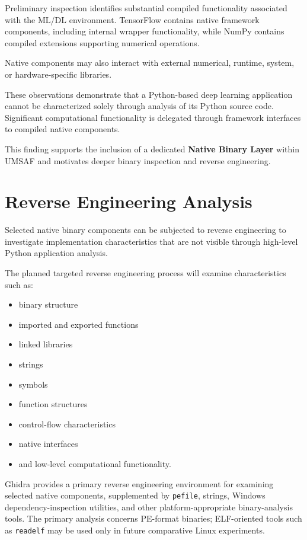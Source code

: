 \documentclass[
  12pt,
  letterpaper,
  oneside]{report}
\providecommand{\tightlist}{%
  \setlength{\itemsep}{0pt}\setlength{\parskip}{0pt}}
\begin{document}
Preliminary inspection identifies substantial compiled functionality
associated with the ML/DL environment. TensorFlow contains native
framework components, including internal wrapper functionality, while
NumPy contains compiled extensions supporting numerical operations.

Native components may also interact with external numerical, runtime,
system, or hardware-specific libraries.

These observations demonstrate that a Python-based deep learning
application cannot be characterized solely through analysis of its
Python source code. Significant computational functionality is delegated
through framework interfaces to compiled native components.

This finding supports the inclusion of a dedicated \textbf{Native Binary
Layer} within UMSAF and motivates deeper binary inspection and reverse
engineering.

\section{Reverse Engineering Analysis}\label{96-reverse-engineering-analysis}

Selected native binary components can be subjected to reverse
engineering to investigate implementation characteristics that are not
visible through high-level Python application analysis.

The planned targeted reverse engineering process will examine
characteristics such as:

\begin{itemize}
\tightlist
\item
  binary structure
\item
  imported and exported functions
\item
  linked libraries
\item
  strings
\item
  symbols
\item
  function structures
\item
  control-flow characteristics
\item
  native interfaces
\item
  and low-level computational functionality.
\end{itemize}

Ghidra provides a primary reverse engineering environment for examining
selected native components, supplemented by \texttt{pefile}, strings,
Windows dependency-inspection utilities, and other platform-appropriate
binary-analysis tools. The primary analysis concerns PE-format binaries;
ELF-oriented tools such as \texttt{readelf} may be used only in future
comparative Linux experiments.
\end{document}
